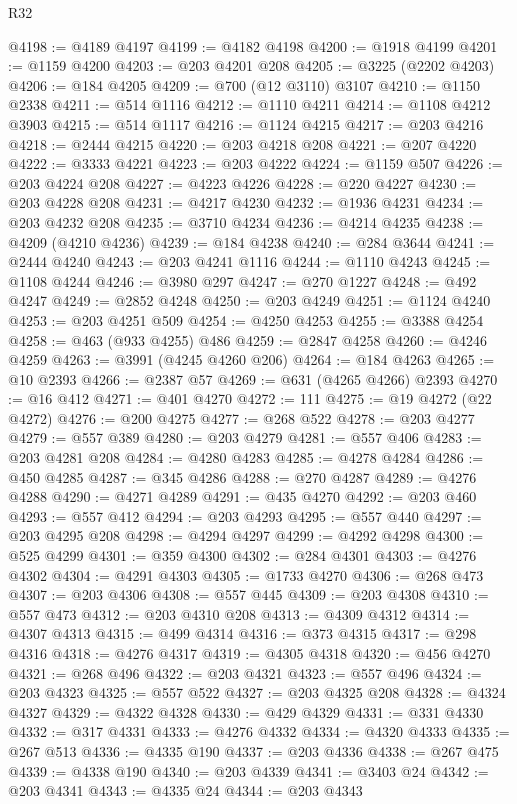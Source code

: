 \begin{lexlean}{R32}
\begin{coremodule}
@4198 := @4189 @4197
@4199 := @4182 @4198
@4200 := @1918 @4199
@4201 := @1159 @4200
@4203 := @203 @4201 @208
@4205 := @3225 (@2202 @4203)
@4206 := @184 @4205
@4209 := @700 (@12 @3110) @3107
@4210 := @1150 @2338
@4211 := @514 @1116
@4212 := @1110 @4211
@4214 := @1108 @4212 @3903
@4215 := @514 @1117
@4216 := @1124 @4215
@4217 := @203 @4216
@4218 := @2444 @4215
@4220 := @203 @4218 @208
@4221 := @207 @4220
@4222 := @3333 @4221
@4223 := @203 @4222
@4224 := @1159 @507
@4226 := @203 @4224 @208
@4227 := @4223 @4226
@4228 := @220 @4227
@4230 := @203 @4228 @208
@4231 := @4217 @4230
@4232 := @1936 @4231
@4234 := @203 @4232 @208
@4235 := @3710 @4234
@4236 := @4214 @4235
@4238 := @4209 (@4210 @4236)
@4239 := @184 @4238
@4240 := @284 @3644
@4241 := @2444 @4240
@4243 := @203 @4241 @1116
@4244 := @1110 @4243
@4245 := @1108 @4244
@4246 := @3980 @297
@4247 := @270 @1227
@4248 := @492 @4247
@4249 := @2852 @4248
@4250 := @203 @4249
@4251 := @1124 @4240
@4253 := @203 @4251 @509
@4254 := @4250 @4253
@4255 := @3388 @4254
@4258 := @463 (@933 @4255) @486
@4259 := @2847 @4258
@4260 := @4246 @4259
@4263 := @3991 (@4245 @4260 @206)
@4264 := @184 @4263
@4265 := @10 @2393
@4266 := @2387 @57
@4269 := @631 (@4265 @4266) @2393
@4270 := @16 @412
@4271 := @401 @4270
@4272 := 111
@4275 := @19 @4272 (@22 @4272)
@4276 := @200 @4275
@4277 := @268 @522
@4278 := @203 @4277
@4279 := @557 @389
@4280 := @203 @4279
@4281 := @557 @406
@4283 := @203 @4281 @208
@4284 := @4280 @4283
@4285 := @4278 @4284
@4286 := @450 @4285
@4287 := @345 @4286
@4288 := @270 @4287
@4289 := @4276 @4288
@4290 := @4271 @4289
@4291 := @435 @4270
@4292 := @203 @460
@4293 := @557 @412
@4294 := @203 @4293
@4295 := @557 @440
@4297 := @203 @4295 @208
@4298 := @4294 @4297
@4299 := @4292 @4298
@4300 := @525 @4299
@4301 := @359 @4300
@4302 := @284 @4301
@4303 := @4276 @4302
@4304 := @4291 @4303
@4305 := @1733 @4270
@4306 := @268 @473
@4307 := @203 @4306
@4308 := @557 @445
@4309 := @203 @4308
@4310 := @557 @473
@4312 := @203 @4310 @208
@4313 := @4309 @4312
@4314 := @4307 @4313
@4315 := @499 @4314
@4316 := @373 @4315
@4317 := @298 @4316
@4318 := @4276 @4317
@4319 := @4305 @4318
@4320 := @456 @4270
@4321 := @268 @496
@4322 := @203 @4321
@4323 := @557 @496
@4324 := @203 @4323
@4325 := @557 @522
@4327 := @203 @4325 @208
@4328 := @4324 @4327
@4329 := @4322 @4328
@4330 := @429 @4329
@4331 := @331 @4330
@4332 := @317 @4331
@4333 := @4276 @4332
@4334 := @4320 @4333
@4335 := @267 @513
@4336 := @4335 @190
@4337 := @203 @4336
@4338 := @267 @475
@4339 := @4338 @190
@4340 := @203 @4339
@4341 := @3403 @24
@4342 := @203 @4341
@4343 := @4335 @24
@4344 := @203 @4343

\end{coremodule}
\end{lexlean}
